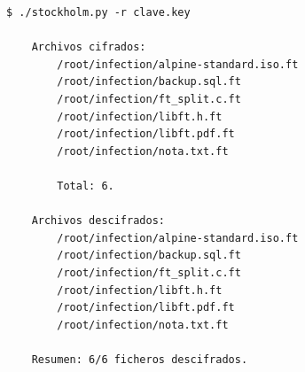                 \begin{lstlisting}[style=bash_style, basicstyle=\ttfamily\scriptsize, caption={Fragmento de la salida del proyecto \texttt{stockholm}.}]
    $ ./stockholm.py -r clave.key

    Archivos cifrados:
        /root/infection/alpine-standard.iso.ft
        /root/infection/backup.sql.ft
        /root/infection/ft_split.c.ft
        /root/infection/libft.h.ft
        /root/infection/libft.pdf.ft
        /root/infection/nota.txt.ft

        Total: 6.

    Archivos descifrados:
        /root/infection/alpine-standard.iso.ft
        /root/infection/backup.sql.ft
        /root/infection/ft_split.c.ft
        /root/infection/libft.h.ft
        /root/infection/libft.pdf.ft
        /root/infection/nota.txt.ft

    Resumen: 6/6 ficheros descifrados.
                \end{lstlisting}
